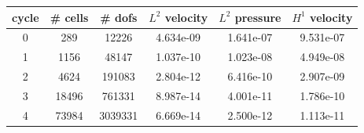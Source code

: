 \documentclass[10pt]{report}
\begin{document}
\begin{table}[H]
\begin{center}
\begin{tabular}{|c|c|c|c|c|c|} \hline
cycle & \# cells & \# dofs & $L^2$ velocity & $L^2$ pressure & $H^1$ velocity\\ \hline
0 & 289 & 12226 & 4.634e-09 & 1.641e-07 & 9.531e-07\\ \hline
1 & 1156 & 48147 & 1.037e-10 & 1.023e-08 & 4.949e-08\\ \hline
2 & 4624 & 191083 & 2.804e-12 & 6.416e-10 & 2.907e-09\\ \hline
3 & 18496 & 761331 & 8.987e-14 & 4.001e-11 & 1.786e-10\\ \hline
4 & 73984 & 3039331 & 6.669e-14 & 2.500e-12 & 1.113e-11\\ \hline
\end{tabular}
\end{center}
\end{table}
\end{document}
